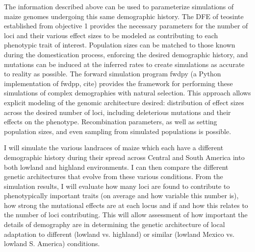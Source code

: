 The information described above can be used to parameterize simulations of maize genomes undergoing this same demographic history. The DFE of teosinte established from objective 1 provides the necessary parameters for the number of loci and their various effect sizes to be modeled as contributing to each phenotypic trait of interest. Population sizes can be matched to those known during the domestication process, enforcing the desired demographic history, and mutations can be induced at the inferred rates to create simulations as accurate to reality as possible.  The forward simulation program fwdpy (a Python implementation of fwdpp, cite) provides the framework for performing these simulations of complex demographies with natural selection. This approach allows explicit modeling of the genomic architecture desired: distribution of effect sizes across the desired number of loci, including deleterious mutations and their effects on the phenotype. Recombination parameters, as well as setting population sizes, and even sampling from simulated populations is possible.

 I will simulate the various landraces of maize which each have a different demographic history during their spread across Central and South America into both lowland and highland environments.  I can then compare the different genetic architectures that evolve from these various conditions. From the simulation results, I will evaluate how many loci are found to contribute to phenotypically important traits (on average and how variable this number is), how strong the mutational effects are at each locus and if and how this relates to the number of loci contributing. This will allow assessment of how important the details of demography are in determining the genetic architecture of local adaptation to different (lowland vs. highland) or similar (lowland Mexico vs. lowland S. America) conditions. 

